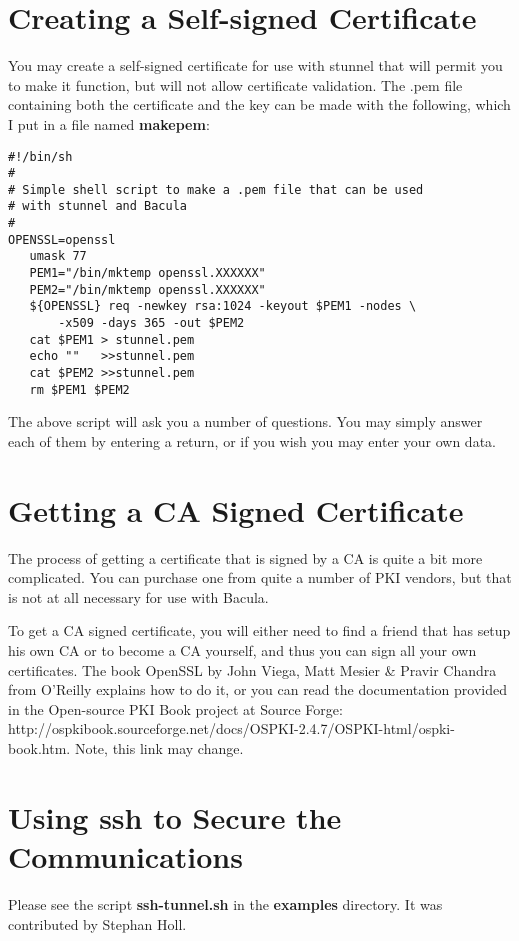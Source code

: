 \section{Creating a Self-signed Certificate}

You may create a self-signed certificate for use with stunnel that will permit
you to make it function, but will not allow certificate validation. The .pem
file containing both the certificate and the key can be made with the
following, which I put in a file named {\bf makepem}:

\footnotesize
\begin{verbatim}
#!/bin/sh
#
# Simple shell script to make a .pem file that can be used
# with stunnel and Bacula
#
OPENSSL=openssl
   umask 77
   PEM1="/bin/mktemp openssl.XXXXXX"
   PEM2="/bin/mktemp openssl.XXXXXX"
   ${OPENSSL} req -newkey rsa:1024 -keyout $PEM1 -nodes \
       -x509 -days 365 -out $PEM2
   cat $PEM1 > stunnel.pem
   echo ""   >>stunnel.pem
   cat $PEM2 >>stunnel.pem
   rm $PEM1 $PEM2
\end{verbatim}
\normalsize

The above script will ask you a number of questions. You may simply answer
each of them by entering a return, or if you wish you may enter your own data.


\section{Getting a CA Signed Certificate}

The process of getting a certificate that is signed by a CA is quite a bit
more complicated. You can purchase one from quite a number of PKI vendors, but
that is not at all necessary for use with Bacula.

To get a CA signed
certificate, you will either need to find a friend that has setup his own CA
or to become a CA yourself, and thus you can sign all your own certificates.
The book OpenSSL by John Viega, Matt Mesier \& Pravir Chandra from O'Reilly
explains how to do it, or you can read the documentation provided in the
Open-source PKI Book project at Source Forge:
{http://ospkibook.sourceforge.net/docs/OSPKI-2.4.7/OSPKI-html/ospki-book.htm}.
Note, this link may change.

\section{Using ssh to Secure the Communications}

Please see the script {\bf ssh-tunnel.sh} in the {\bf examples} directory. It
was contributed by Stephan Holl.
